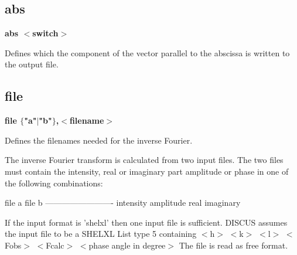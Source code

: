 \subsection*{abs}
{\bf abs $ <$switch$> $ \par }
\par
\vspace{3pt}
Defines which the component of the vector parallel to the abscissa 
is written to the output file. 
\subsection*{file}
{\bf file $ \{$"a"$| $"b"$\} $,$ <$filename$> $ \par }
\par
\vspace{3pt}
Defines the filenames needed for the inverse Fourier. 
\par
The inverse Fourier transform is calculated from two input files. 
The two files must contain the intensity, real or imaginary part 
amplitude or phase in one of the following combinations: 
\par
\begin{MacVerbatim}
file a          file b
-------------------------
intensity
amplitude
real            imaginary
\end{MacVerbatim}
If the input format is 'shelxl' then one input file is sufficient. 
DISCUS assumes the input file to be a SHELXL List type 5 containing 
$ <$h$> $ $ <$k$> $ $ <$l$> $ $ <$Fobs$> $ $ <$Fcalc$> $ $ <$phase angle in degree$> $ 
The file is read as free format. 
